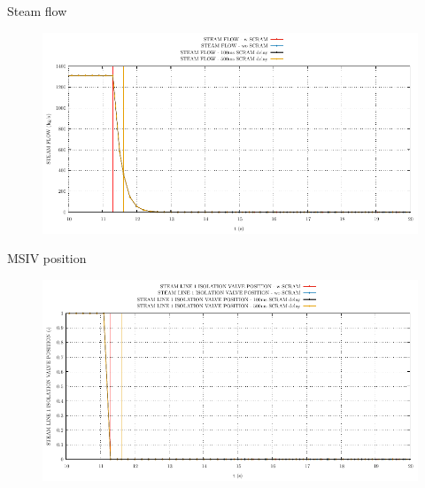 \begin{frame}{Steam flow}
	\begin{figure}
		\centering
		\includegraphics[width=\textwidth]{./01PressureAccident/graphs/STEAM FLOW_comp.pdf}
		
	\end{figure}
	
\end{frame}




\begin{frame}{MSIV position}
	\begin{figure}
		\centering
		\includegraphics[width=\textwidth]{./01PressureAccident/graphs/STEAM LINE 1 ISOLATION VALVE POSITION_comp.pdf}
		
	\end{figure}
	
\end{frame}








